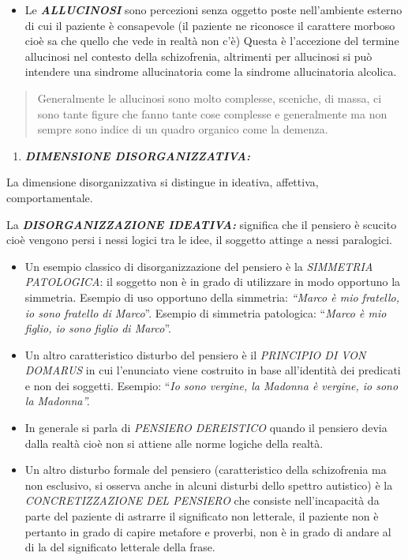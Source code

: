 \documentclass[]{article}
\begin{document}
\begin{itemize}
\item
  Le \textbf{\emph{ALLUCINOSI}} sono percezioni senza oggetto poste
  nell'ambiente esterno di cui il paziente è consapevole (il paziente ne
  riconosce il carattere morboso cioè sa che quello che vede in realtà
  non c'è) Questa è l'accezione del termine allucinosi nel contesto
  della schizofrenia, altrimenti per allucinosi si può intendere una
  sindrome allucinatoria come la sindrome allucinatoria alcolica.
\end{itemize}

\begin{quote}
Generalmente le allucinosi sono molto complesse, sceniche, di massa, ci
sono tante figure che fanno tante cose complesse e generalmente ma non
sempre sono indice di un quadro organico come la demenza.
\end{quote}

\begin{enumerate}
\def\labelenumi{\arabic{enumi}.}
\item
  \textbf{\emph{DIMENSIONE DISORGANIZZATIVA:}}
\end{enumerate}

La dimensione disorganizzativa si distingue in ideativa, affettiva,
comportamentale.

La \textbf{\emph{DISORGANIZZAZIONE IDEATIVA:}} significa che il pensiero
è scucito cioè vengono persi i nessi logici tra le idee, il soggetto
attinge a nessi paralogici.

\begin{itemize}
\item
  Un esempio classico di disorganizzazione del pensiero è la
  \emph{SIMMETRIA PATOLOGICA}: il soggetto non è in grado di utilizzare
  in modo opportuno la simmetria. Esempio di uso opportuno della
  simmetria: \emph{``Marco è mio fratello, io sono fratello di Marco}''.
  Esempio di simmetria patologica: ``\emph{Marco è mio figlio, io sono
  figlio di Marco}''.
\item
  Un altro caratteristico disturbo del pensiero è il \emph{PRINCIPIO DI
  VON DOMARUS} in cui l'enunciato viene costruito in base all'identità
  dei predicati e non dei soggetti. Esempio: ``\emph{Io sono vergine, la
  Madonna è vergine, io sono la Madonna''. }
\item
  In generale si parla di \emph{PENSIERO DEREISTICO} quando il pensiero
  devia dalla realtà cioè non si attiene alle norme logiche della
  realtà.
\item
  Un altro disturbo formale del pensiero (caratteristico della
  schizofrenia ma non esclusivo, si osserva anche in alcuni disturbi
  dello spettro autistico) è la \emph{CONCRETIZZAZIONE DEL PENSIERO} che
  consiste nell'incapacità da parte del paziente di astrarre il
  significato non letterale, il paziente non è pertanto in grado di
  capire metafore e proverbi, non è in grado di andare al di la del
  significato letterale della frase.
\end{itemize}
\end{document}
